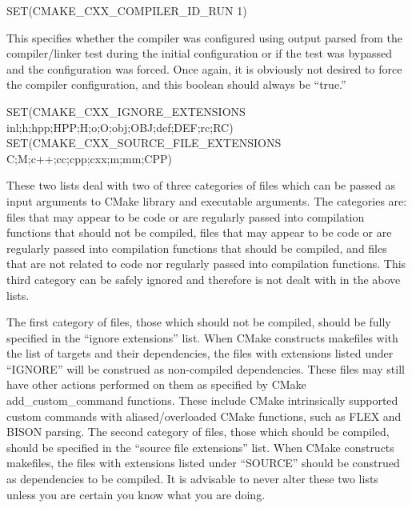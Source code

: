 \documentclass[12pt,letterpaper]{article}
\begin{document}
\begin{shaded}
\noindent SET(CMAKE\_CXX\_COMPILER\_ID\_RUN 1)
\end{shaded}

This specifies whether the compiler was configured using output parsed from the compiler/linker test during the initial configuration or if the test was bypassed and the configuration was forced.  Once again, it is obviously not desired to force the compiler configuration, and this boolean should always be ``true.''

\begin{shaded}
\noindent SET(CMAKE\_CXX\_IGNORE\_EXTENSIONS inl;h;hpp;HPP;H;o;O;obj;OBJ;def;DEF;rc;RC)\\
SET(CMAKE\_CXX\_SOURCE\_FILE\_EXTENSIONS C;M;c++;cc;cpp;cxx;m;mm;CPP)
\end{shaded}

These two lists deal with two of three categories of files which can be passed as input arguments to CMake library and executable arguments.  The categories are: files that may appear to be code or are regularly passed into compilation functions that should not be compiled, files that may appear to be code or are regularly passed into compilation functions that should be compiled, and files that are not related to code nor regularly passed into compilation functions.  This third category can be safely ignored and therefore is not dealt with in the above lists.

The first category of files, those which should not be compiled, should be fully specified in the ``ignore extensions'' list.  When CMake constructs makefiles with the list of targets and their dependencies, the files with extensions listed under ``IGNORE'' will be construed as non-compiled dependencies.  These files may still have other actions performed on them as specified by CMake add\_custom\_command functions.  These include CMake intrinsically supported custom commands with aliased/overloaded CMake functions, such as FLEX and BISON parsing.  The second category of files, those which should be compiled, should be specified in the ``source file extensions'' list.  When CMake constructs makefiles, the files with extensions listed under ``SOURCE'' should be construed as dependencies to be compiled.  It is advisable to never alter these two lists unless you are certain you know what you are doing.
\end{document}
